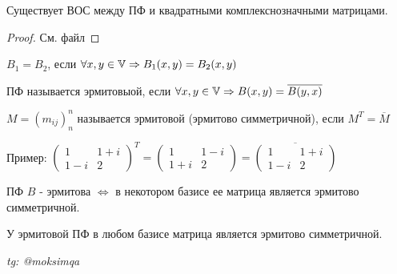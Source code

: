 \documentclass[../main.tex]{subfiles}
\begin{document}
Существует ВОС между ПФ и квадратными комплекснозначными матрицами. 
\begin{proof}
    См. файл
\end{proof}
    
\begin{definition}
    $B_{1}=B_{2}$, если $\forall x,y \in \mathbb{V}\Rightarrow B_{1}(x,y)= B_{2}(x,y)$
\end{definition}

\begin{definition}
    ПФ называется эрмитовыой, если $\forall x,y \in \V\implies B(x,y)=\overline{B(y,x)}$
\end{definition}
\begin{definition}
    $M= (m_{ij})^{n}_{n}$ называется эрмитовой (эрмитово симметричной), если $M^{T}= \overline{M}$
\end{definition}
\vspace{0.2cm}
Пример: $\begin{pmatrix}
    1 & 1+i \\ 
    1-i & 2
\end{pmatrix}^{T} = \begin{pmatrix}
    1 & 1-i \\ 
    1+i & 2

\end{pmatrix} = \overline{\begin{pmatrix}
    1 & 1+i \\ 
    1-i & 2
\end{pmatrix}}$


\begin{theorem}
    ПФ $B$ - эрмитова $\Leftrightarrow $ в некотором базисе ее матрица является эрмитово симметричной.    
\end{theorem}
\begin{corollary}
    У эрмитовой ПФ в любом базисе матрица является эрмитово симметричной.    
\end{corollary}

\vspace{1cm}
\begin{flushright}
    \textit{tg: @moksimqa}
\end{flushright}
\end{document}
